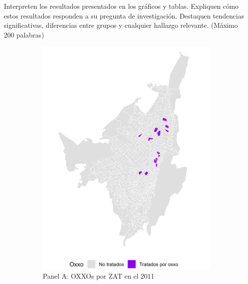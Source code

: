 \documentclass{article}
\begin{document}
Interpreten los resultados presentados en los gráficos y tablas. Expliquen cómo estos resultados responden a su pregunta de investigación. Destaquen tendencias significativas, diferencias entre grupos y cualquier hallazgo relevante. (Máximo 200 palabras)

\begin{figure}
    \centering
    \begin{subfigure}[b]{0.4\textwidth} %
        \includegraphics[width=\linewidth]{figs_oxxo_maps/mapa_oxxos_binary_2011.png}
        \caption{Panel A: OXXOs por ZAT en el 2011}
        \label{fig:panelA}
    \end{subfigure}
    \hfill
    \begin{subfigure}[b]{0.4\textwidth} %

\end{subfigure}
\end{figure}
\end{document}
